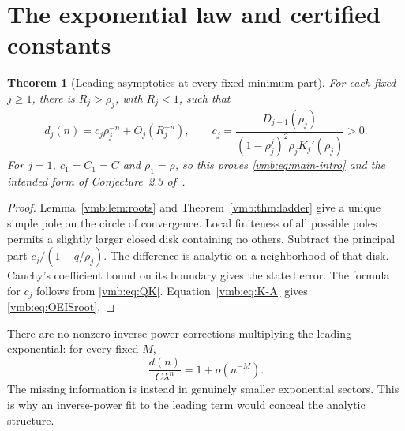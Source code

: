 \documentclass[11pt,a4paper]{article}
\numberwithin{equation}{section}
\newtheorem{theorem}{Theorem}[section]
\theoremstyle{definition}\newtheorem{definition}[theorem]{Definition}
\theoremstyle{remark}\newtheorem{remark}[theorem]{Remark}
\begin{document}
\section{The exponential law and certified constants}\label{vmb:sec:leading}

\begin{theorem}[Leading asymptotics at every fixed minimum part]
\label{vmb:thm:leading}
For each fixed \(j\geq1\), there is \(R_j>\rho_j\), with
\(R_j<1\), such that
\begin{equation}\label{vmb:eq:leadingj}
d_j(n)=c_j\rho_j^{-n}+O_j(R_j^{-n}),
\qquad
c_j=\frac{D_{j+1}(\rho_j)}
{(1-\rho_j^j)^2\rho_jK_j'(\rho_j)}>0.
\end{equation}
For \(j=1\), \(c_1=C_1=C\) and \(\rho_1=\rho\), so this proves
\eqref{vmb:eq:main-intro} and the intended form of Conjecture~2.3 of~\cite{FRV}.
\end{theorem}
\begin{proof}
Lemma~\ref{vmb:lem:roots} and Theorem~\ref{vmb:thm:ladder} give a unique simple
pole on the circle of convergence. Local finiteness of all possible
poles permits a slightly larger closed disk containing no others.
Subtract the principal part \(c_j/(1-q/\rho_j)\). The difference is
analytic on a neighborhood of that disk. Cauchy's coefficient bound on
its boundary gives the stated error. The formula for \(c_j\) follows
from \eqref{vmb:eq:QK}. Equation~\eqref{vmb:eq:K-A} gives
\eqref{vmb:eq:OEISroot}.
\end{proof}

There are no nonzero inverse-power corrections multiplying the leading
exponential: for every fixed \(M\),
\begin{equation}
\frac{d(n)}{C\lambda^n}=1+o(n^{-M}).
\end{equation}
The missing information is instead in genuinely smaller exponential
sectors. This is why an inverse-power fit to the leading term would
conceal the analytic structure.
\end{document}
